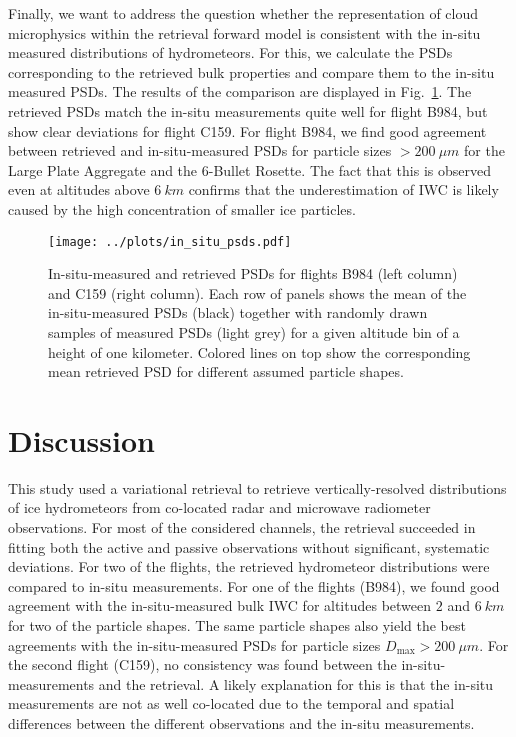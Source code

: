 \documentclass[journal abbreviation, manuscript]{copernicus}
\begin{document}
Finally, we want to address the question whether the representation of cloud
microphysics within the retrieval forward model is consistent with the in-situ
measured distributions of hydrometeors. For this, we calculate the PSDs
corresponding to the retrieved bulk properties and compare them to the in-situ
measured PSDs. The results of the comparison are displayed in
Fig.~\ref{fig:in_situ_psds}. The retrieved PSDs match the in-situ measurements
quite well for flight B984, but show clear deviations for flight C159. For
flight B984, we find good agreement between retrieved and in-situ-measured
PSDs for particle sizes $> 200 \ \unit{\mu m}$ for the Large Plate Aggregate
and the 6-Bullet Rosette. The fact that this is observed even at altitudes above
$6 \ \unit{km}$ confirms that the underestimation of IWC is likely caused by the
high concentration of smaller ice particles.

\begin{figure}[!hbpt]
  \centering
  \texttt{[image: ../plots/in\_situ\_psds.pdf]}
  \caption{In-situ-measured and retrieved PSDs for flights B984 (left column)
    and C159 (right column). Each row of panels shows the mean of the
    in-situ-measured PSDs (black) together with randomly drawn samples of
    measured PSDs (light grey) for a given altitude bin of a height of one
    kilometer. Colored lines on top show the corresponding mean retrieved PSD
    for different assumed particle shapes.}
  \label{fig:in_situ_psds}
\end{figure}

\section{Discussion}
\label{sec:discussion}

This study used a variational retrieval to retrieve vertically-resolved
distributions of ice hydrometeors from co-located radar and microwave radiometer
observations. For most of the considered channels, the retrieval succeeded in
fitting both the active and passive observations without significant, systematic
deviations. For two of the flights, the retrieved hydrometeor distributions
were compared to in-situ measurements. For one of the flights (B984), we
found good agreement with the in-situ-measured bulk IWC for altitudes between
$2$ and $6\ \unit{km}$ for two of the particle shapes. The same particle shapes
also yield the best agreements with the in-situ-measured PSDs for particle sizes
$D_\text{max} > 200\ \unit{\mu m}$. For the second flight (C159), no consistency
was found between the in-situ-measurements and the retrieval. A likely
explanation for this is that the in-situ measurements are not as well co-located
due to the temporal and spatial differences between the different observations
and the in-situ measurements.
\end{document}
